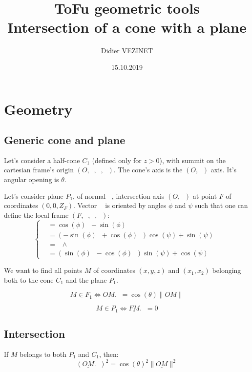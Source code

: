 \documentclass[a4paper,11pt,twoside,titlepage,openright]{book}
\numberwithin{equation}{section}
\newcommand{\lt}{\left}
\newcommand{\rt}{\right}
\DeclareMathOperator{\n}{\underline{n}}
\DeclareMathOperator{\ei}{\underline{e}_1}
\DeclareMathOperator{\et}{\underline{e}_2}
\DeclareMathOperator{\ex}{\underline{e}_x}
\DeclareMathOperator{\ey}{\underline{e}_y}
\DeclareMathOperator{\ez}{\underline{e}_z}
\newcommand{\wdg}{\wedge}
\begin{document}
\title{ToFu geometric tools\\ Intersection of a cone with a plane}
\author{Didier VEZINET}
\date{15.10.2019}
\maketitle

\tableofcontents

\chapter{Geometry}
\label{chap:Definitions}

\section{Generic cone and plane}

Let's consider a half-cone $C_1$ (defined only for $z > 0$), with summit on the cartesian frame's origin $(O, \ex, \ey, \ez)$.
The cone's axis is the $(O,\ez)$ axis.
It's angular opening is $\theta$.

Let's consider plane $P_1$, of normal $\n$, intersection axis $(O,\ez)$ at point $F$ of coordinates $(0,0,Z_F)$.
Vector $\n$ is oriented by angles $\phi$ and $\psi$ such that one can define the local frame $(F, \ei, \et, \n)$:
$$
\lt\{
	\begin{array}{ll}
		\ei & = \cos(\phi)\ex + \sin(\phi)\ey\\
		\et & = \lt(-\sin(\phi)\ex + \cos(\phi)\ey\rt)\cos(\psi) + \sin(\psi)\ez\\
		\n & = \ei \wdg \et\\
		   & = \lt( \sin(\phi)\ex - \cos(\phi)\ey \rt)\sin(\psi) + \cos(\psi)\ez
	\end{array}
\rt.
$$

We want to find all points $M$ of coordinates $(x, y, z)$ and $(x_1, x_2)$ belonging both to the cone $C_1$ and the plane $P_1$.

$$
M \in F_1 \Leftrightarrow \underline{OM}.\ez = \cos(\theta) \|\underline{OM}\|
$$

$$
M \in P_1 \Leftrightarrow \underline{FM}.\n = 0
$$


\section{Intersection}

If $M$ belongs to both $P_1$ and $C_1$, then:
$$
(\underline{OM}.\ez)^2 = \cos(\theta)^2 \|\underline{OM}\|^2
$$
\end{document}
